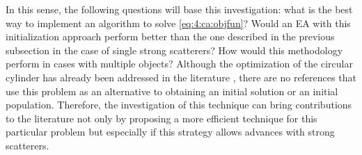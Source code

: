 			In this sense, the following questions will base this investigation: what is the best way to implement an algorithm to solve \eqref{eq:4:ca:objfun}? Would an EA with this initialization approach perform better than the one described in the previous subsection in the case of single strong scatterers? How would this methodology perform in cases with multiple objects? Although the optimization of the circular cylinder has already been addressed in the literature \citep{michalski2000electromagnetic}, there are no references that use this problem as an alternative to obtaining an initial solution or an initial population. Therefore, the investigation of this technique can bring contributions to the literature not only by proposing a more efficient technique for this particular problem but especially if this strategy allows advances with strong scatterers.

